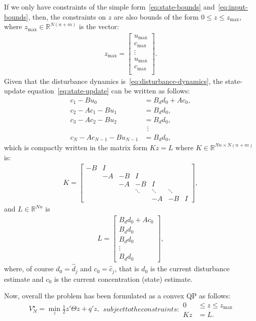 \documentclass[12pt]{scrartcl}
\renewcommand{\Re}{\mathbb{R}}
\begin{document}
If we only have constraints of the simple form~\eqref{eq:state-bounds} and~\eqref{eq:input-bounds},
then, the constraints on $z$ are also bounds of the form $0\leq z \leq z_{\max}$, where
$z_{\max}\in\Re^{N(n+m)}$ is the vector:
\begin{align}
z_{\max}=\left[
\begin{array}{c}
u_{\max}\\
c_{\max}\\
\vdots\\
u_{\max}\\
c_{\max}\\
\end{array}\right].
\end{align}
Given that the disturbance dynamics is~\eqref{eq:disturbance-dynamics}, the
state-update equation~\eqref{eq:state-update} can be written as follows:
\begin{align*}
c_1 - Bu_0 &= B_d d_0 + Ac_0,\\
c_2 - Ac_1 - Bu_1 &= B_d d_0,\\
c_3 - Ac_2 - Bu_2 &= B_d d_0,\\
&\ \ \vdots\\
c_N - Ac_{N-1}-Bu_{N-1} &= B_d d_0,
\end{align*}
which is compactly written in the matrix form $Kz = L$ where $K\in\Re^{Nn\times N(n+m)}$ is:
\begin{align}
K=\left[\begin{array}{ccccccc}
-B & I\\
& -A & -B &I\\
&& -A & -B &I\\
&&&\ddots & \ddots & \ddots\\
&&&&-A&-B&I
\end{array}\right],
\end{align}
and $L\in \Re^{Nn}$ is
\begin{align}
L=\left[
\begin{array}{c}
B_d d_0 + Ac_0\\
B_d d_0\\
B_d d_0\\
\vdots\\
B_d d_0
\end{array}\right],
\end{align}
where, of course $d_0=\hat{d}_j$ and $c_0=\hat{c}_j$, that is
$d_0$ is the current disturbance estimate and $c_0$ is the current
concentration (state) estimate.

Now, overall the problem has been formulated as a convex QP as follows:
\begin{subequations}
\begin{align}
V_N^\star = \min_{z} \frac{1}{2}z'\Theta z + q'z,
\end{align}
subject to the constraints:
\begin{align}
0 &\leq z \leq z_{\max}\label{eq:z-bound}\\
Kz &= L.
\end{align}
\end{subequations}
\end{document}

